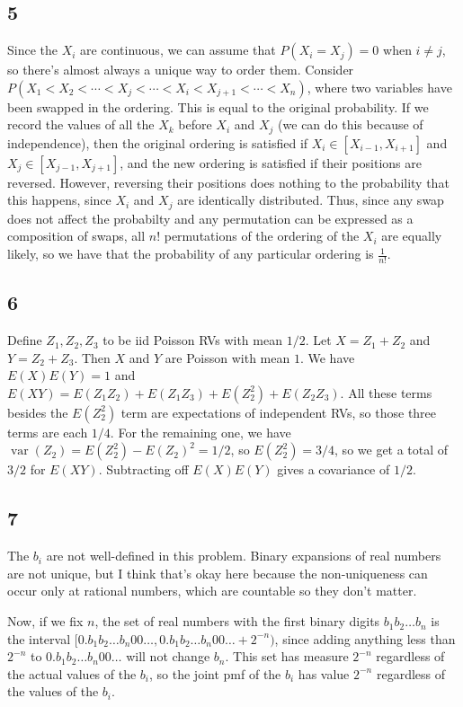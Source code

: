 \documentclass{article}
\DeclareMathOperator{\var}{var}
\begin{document}
\subsection*{5}
Since the $X_i$ are continuous, we can assume that $P(X_i=X_j)=0$ when $i\neq j$, so there's almost always a unique way to order them. Consider $P(X_1<X_2<\cdots<X_j<\cdots<X_i<X_{j+1}<\cdots<X_n)$, where two variables have been swapped in the ordering. This is equal to the original probability. If we record the values of all the $X_k$ before $X_i$ and $X_j$ (we can do this because of independence), then the original ordering is satisfied if $X_i\in[X_{i-1},X_{i+1}]$ and $X_j\in[X_{j-1},X_{j+1}]$, and the new ordering is satisfied if their positions are reversed. However, reversing their positions does nothing to the probability that this happens, since $X_i$ and $X_j$ are identically distributed. Thus, since any swap does not affect the probabilty and any permutation can be expressed as a composition of swaps, all $n!$ permutations of the ordering of the $X_i$ are equally likely, so we have that the probability of any particular ordering is $\frac{1}{n!}$.
\subsection*{6}
Define $Z_1,Z_2,Z_3$ to be iid Poisson RVs with mean $1/2$. Let $X=Z_1+Z_2$ and $Y=Z_2+Z_3$. Then $X$ and $Y$ are Poisson with mean $1$. We have $E(X)E(Y)=1$ and $E(XY)=E(Z_1Z_2)+E(Z_1Z_3)+E(Z_2^2)+E(Z_2Z_3)$. All these terms besides the $E(Z_2^2)$ term are expectations of independent RVs, so those three terms are each $1/4$. For the remaining one, we have $\var(Z_2)=E(Z_2^2)-E(Z_2)^2=1/2$, so $E(Z_2^2)=3/4$, so we get a total of $3/2$ for $E(XY)$. Subtracting off $E(X)E(Y)$ gives a covariance of $1/2$.
\subsection*{7}
The $b_i$ are not well-defined in this problem. Binary expansions of real numbers are not unique, but I think that's okay here because the non-uniqueness can occur only at rational numbers, which are countable so they don't matter.

Now, if we fix $n$, the set of real numbers with the first binary digits $b_1b_2\ldots b_n$ is the interval $[0.b_1b_2\ldots b_n00\ldots,0.b_1b_2\ldots b_n00\ldots+2^{-n})$, since adding anything less than $2^{-n}$ to $0.b_1b_2\ldots b_n00\ldots$ will not change $b_n$. This set has measure $2^{-n}$ regardless of the actual values of the $b_i$, so the joint pmf of the $b_i$ has value $2^{-n}$ regardless of the values of the $b_i$.
\end{document}
